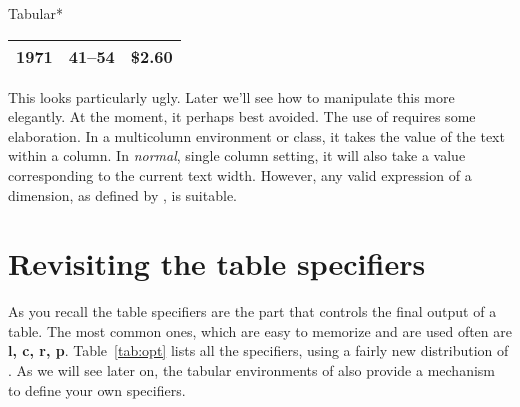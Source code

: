 \begin{texexample}{Tabular*}{}
\begin{tabular*}{\linewidth}{|r|c|c|}
\hline
1971 & 41--54 & \$2.60 \\
\hline
\end{tabular*}
\end{texexample}

This looks particularly ugly. Later we'll see how to manipulate
this more elegantly. At the moment, it perhaps best
avoided. The use of \cmd{\linewidth} requires some elaboration.
In a multicolumn environment or class, it takes the value of
the text within a column. In \emph{normal}, single column setting,
it will also take a value corresponding to the current text
width. However, any valid expression of a dimension, as defined by \tex, is suitable.

\section{Revisiting the table specifiers}

As you recall the table specifiers are the part that controls the final output of a table. The most common ones, which are easy to memorize and are used often are \textbf{l, c, r, p}. Table~\ref{tab:opt} lists all the specifiers, using a fairly new distribution of \latexe. As we will see later on, the tabular environments of \latexe also provide a mechanism to define your own specifiers.  

